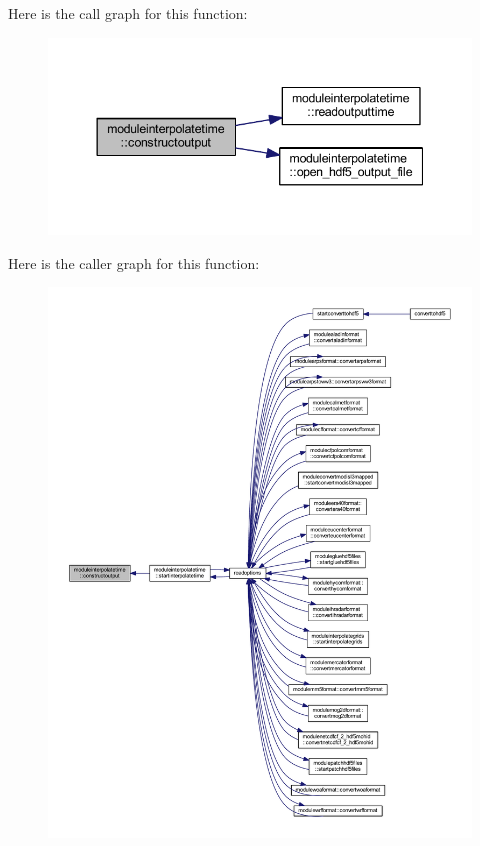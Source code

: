 Here is the call graph for this function\+:\nopagebreak
\begin{figure}[H]
\begin{center}
\leavevmode
\includegraphics[width=344pt]{namespacemoduleinterpolatetime_af73c04e1fcd85cc293ad3c88c2420ff2_cgraph}
\end{center}
\end{figure}
Here is the caller graph for this function\+:\nopagebreak
\begin{figure}[H]
\begin{center}
\leavevmode
\includegraphics[width=350pt]{namespacemoduleinterpolatetime_af73c04e1fcd85cc293ad3c88c2420ff2_icgraph}
\end{center}
\end{figure}
\mbox{\label{namespacemoduleinterpolatetime_a8b49478334350c51e3c3ffbd530b77c7}} 
